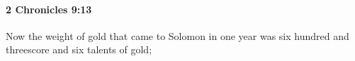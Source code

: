 
		\paragraph{2 Chronicles 9:13} %
			\label{2CHRONICLES-9-13}

			Now the weight of gold that came to Solomon in one year was six hundred and threescore and six talents of gold;



